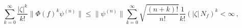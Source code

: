 \begin{equation*}
  \sum_{k=0}^\infty\frac{|\zeta|^k}{k!}\|\Phi(f)^k\psi^{(n)}\| \leq \|\psi^{(n)}\|\sum_{k=0}^\infty \sqrt{\frac{(n+k)!}{n!}}\frac{1}{k!}(|\zeta|\,N_f)^k < \infty\,,
\end{equation*}

